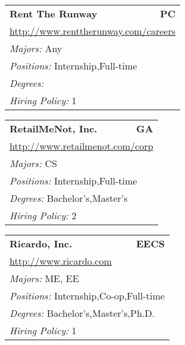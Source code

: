\documentclass[twoside]{article}
\begin{document}
\begin{center}
\begin{multicols}{3}
\begin{FlushLeft}
\begin{minipage}{.9\columnwidth}
\end{minipage}
 
\begin{minipage}{.9\columnwidth}\begin{tabularx}{.95\columnwidth}{Xr}
                 {\Large\bf Rent The Runway} & {\Large\bf PC}\\
    \multicolumn{2}{p{.95\columnwidth}}{\url{http://www.renttherunway.com/careers}}\\
    \multicolumn{2}{p{.95\columnwidth}}{\emph{Majors:} Any}\\
    \multicolumn{2}{p{.95\columnwidth}}{\emph{Positions:} Internship,Full-time}\\
    \multicolumn{2}{p{.95\columnwidth}}{\emph{Degrees:} }\\
    \multicolumn{2}{p{.95\columnwidth}}{\emph{Hiring Policy:} 1}\\
    \end{tabularx}
    
\end{minipage}
 
\begin{minipage}{.9\columnwidth}\begin{tabularx}{.95\columnwidth}{Xr}
                 {\Large\bf RetailMeNot, Inc.} & {\Large\bf GA}\\
    \multicolumn{2}{p{.95\columnwidth}}{\url{http://www.retailmenot.com/corp}}\\
    \multicolumn{2}{p{.95\columnwidth}}{\emph{Majors:} CS}\\
    \multicolumn{2}{p{.95\columnwidth}}{\emph{Positions:} Internship,Full-time}\\
    \multicolumn{2}{p{.95\columnwidth}}{\emph{Degrees:} Bachelor's,Master's}\\
    \multicolumn{2}{p{.95\columnwidth}}{\emph{Hiring Policy:} 2}\\
    \end{tabularx}
    
\end{minipage}
 
\begin{minipage}{.9\columnwidth}\begin{tabularx}{.95\columnwidth}{Xr}
                 {\Large\bf Ricardo, Inc.} & {\Large\bf EECS}\\
    \multicolumn{2}{p{.95\columnwidth}}{\url{http://www.ricardo.com}}\\
    \multicolumn{2}{p{.95\columnwidth}}{\emph{Majors:} ME, EE}\\
    \multicolumn{2}{p{.95\columnwidth}}{\emph{Positions:} Internship,Co-op,Full-time}\\
    \multicolumn{2}{p{.95\columnwidth}}{\emph{Degrees:} Bachelor's,Master's,Ph.D.}\\
    \multicolumn{2}{p{.95\columnwidth}}{\emph{Hiring Policy:} 1}\\
    \end{tabularx}
    

\end{minipage}
\end{FlushLeft}
\end{multicols}
\end{center}
\end{document}
